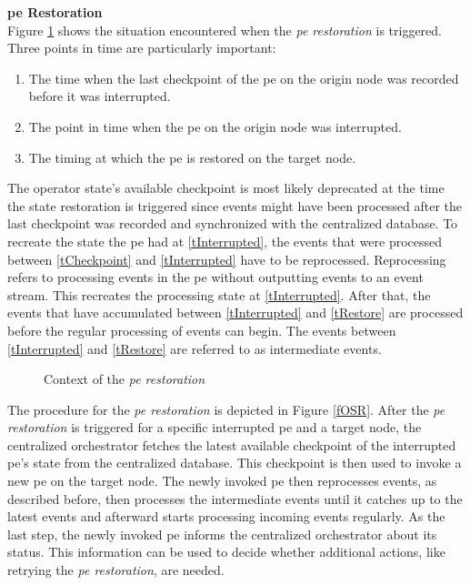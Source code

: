 \textbf{\acrlong{pe} Restoration}\\
Figure \ref{fTimingOSR} shows the situation encountered when the \textit{\acrshort{pe} restoration} is triggered. Three points in time are particularly important:

\begin{enumerate}
    \item \label{tCheckpoint}The time when the last checkpoint of the \gls{pe} on the origin node was recorded before it was interrupted.
    \item \label{tInterrupted}The point in time when the \gls{pe} on the origin node was interrupted.
    \item \label{tRestore} The timing at which the \gls{pe} is restored on the target node.
\end{enumerate}

The operator state's available checkpoint is most likely deprecated at the time the state restoration is triggered since events might have been processed after the last checkpoint was recorded and synchronized with the centralized database. To recreate the state the \gls{pe} had at \ref{tInterrupted}, the events that were processed between \ref{tCheckpoint} and \ref{tInterrupted} have to be reprocessed. Reprocessing refers to processing events in the \gls{pe} without outputting events to an event stream. This recreates the processing state at \ref{tInterrupted}. After that, the events that have accumulated between \ref{tInterrupted} and \ref{tRestore} are processed before the regular processing of events can begin. The events between \ref{tInterrupted} and \ref{tRestore} are referred to as intermediate events.\\

\begin{figure}[!ht]
\graphicspath{{./figures/code/}}

\caption{Context of the \textit{\acrshort{pe} restoration}}
\label{fTimingOSR}
\end{figure}

The procedure for the \textit{\acrshort{pe} restoration} is depicted in Figure \ref{fOSR}. After the \textit{\acrshort{pe} restoration} is triggered for a specific interrupted \gls{pe} and a target node, the centralized orchestrator fetches the latest available checkpoint of the interrupted \gls{pe}'s state from the centralized database. This checkpoint is then used to invoke a new \gls{pe} on the target node. The newly invoked \gls{pe} then reprocesses events, as described before, then processes the intermediate events until it catches up to the latest events and afterward starts processing incoming events regularly. As the last step, the newly invoked \gls{pe} informs the centralized orchestrator about its status. This information can be used to decide whether additional actions, like retrying the \textit{\acrshort{pe} restoration}, are needed.\par

